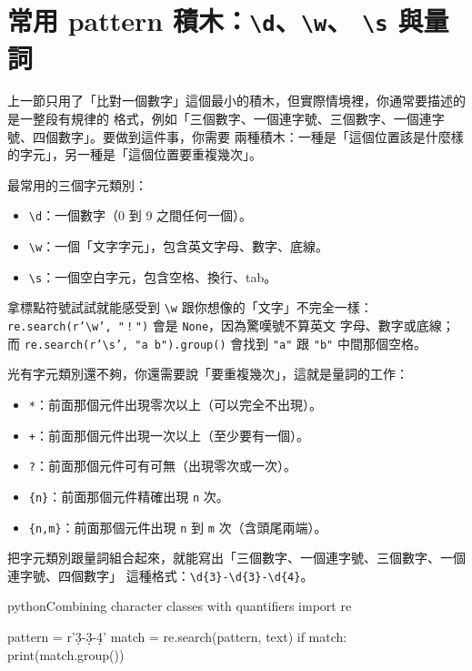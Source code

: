 \section{常用 pattern 積木：\texttt{\textbackslash d}、\texttt{\textbackslash w}、
\texttt{\textbackslash s} 與量詞}
\label{sec:regex-patterns}

上一節只用了「比對一個數字」這個最小的積木，但實際情境裡，你通常要描述的是一整段有規律的
格式，例如「三個數字、一個連字號、三個數字、一個連字號、四個數字」。要做到這件事，你需要
兩種積木：一種是「這個位置該是什麼樣的字元」，另一種是「這個位置要重複幾次」。

最常用的三個字元類別：

\begin{itemize}
\item \texttt{\textbackslash d}：一個數字（0 到 9 之間任何一個）。
\item \texttt{\textbackslash w}：一個「文字字元」，包含英文字母、數字、底線。
\item \texttt{\textbackslash s}：一個空白字元，包含空格、換行、tab。
\end{itemize}

拿標點符號試試就能感受到 \texttt{\textbackslash w} 跟你想像的「文字」不完全一樣：
\texttt{re.search(r'\textbackslash w', "！")} 會是 \texttt{None}，因為驚嘆號不算英文
字母、數字或底線；而 \texttt{re.search(r'\textbackslash s', "a b").group()} 會找到
\texttt{"a"} 跟 \texttt{"b"} 中間那個空格。

光有字元類別還不夠，你還需要說「要重複幾次」，這就是量詞的工作：

\begin{itemize}
\item \texttt{*}：前面那個元件出現零次以上（可以完全不出現）。
\item \texttt{+}：前面那個元件出現一次以上（至少要有一個）。
\item \texttt{?}：前面那個元件可有可無（出現零次或一次）。
\item \texttt{\{n\}}：前面那個元件精確出現 \texttt{n} 次。
\item \texttt{\{n,m\}}：前面那個元件出現 \texttt{n} 到 \texttt{m} 次（含頭尾兩端）。
\end{itemize}

把字元類別跟量詞組合起來，就能寫出「三個數字、一個連字號、三個數字、一個連字號、四個數字」
這種格式：\texttt{\textbackslash d\{3\}-\textbackslash d\{3\}-\textbackslash d\{4\}}。

\begin{code}{python}{Combining character classes with quantifiers}
import re

pattern = r'\d{3}-\d{3}-\d{4}'
match = re.search(pattern, text)
if match:
    print(match.group())
\end{code}

